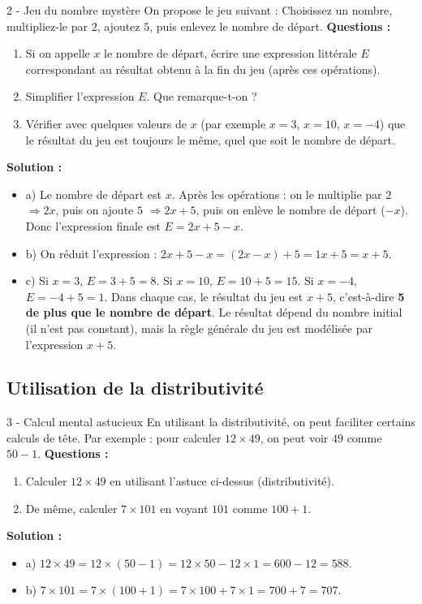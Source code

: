\begin{exercice}{2 - Jeu du nombre mystère} On propose le jeu suivant : \og Choisissez un nombre, multipliez-le par $2$, ajoutez $5$, puis enlevez le nombre de départ. \fg{}
\medskip
\textbf{Questions :} 
\begin{enumerate}[label=\alph*)] 
\item Si on appelle $x$ le nombre de départ, écrire une expression littérale $E$ correspondant au résultat obtenu à la fin du jeu (après ces opérations). 
\item Simplifier l'expression $E$. Que remarque-t-on ? 
\item Vérifier avec quelques valeurs de $x$ (par exemple $x=3$, $x=10$, $x=-4$) que le résultat du jeu est toujours le même, quel que soit le nombre de départ. 
\end{enumerate}

\textbf{Solution :} 
\begin{itemize} 
\item a) Le nombre de départ est $x$. Après les opérations : on le multiplie par $2$ $\Rightarrow 2x$, puis on ajoute $5$ $\Rightarrow 2x + 5$, puis on enlève le nombre de départ ($-x$). Donc l'expression finale est $E = 2x + 5 - x$. 
\item b) On réduit l'expression : $2x + 5 - x = (2x - x) + 5 = 1x + 5 = x + 5$. 
\item c) Si $x=3$, $E = 3 + 5 = 8$. Si $x=10$, $E = 10 + 5 = 15$. Si $x=-4$, $E = -4 + 5 = 1$. Dans chaque cas, le résultat du jeu est $x + 5$, c'est-à-dire \textbf{5 de plus que le nombre de départ}. Le résultat dépend du nombre initial (il n'est pas constant), mais la règle générale du jeu est modélisée par l'expression $x+5$. 
\end{itemize} 
\end{exercice}

\subsection{Utilisation de la distributivité}
\begin{exercice}{3 - Calcul mental astucieux} En utilisant la distributivité, on peut faciliter certains calculs de tête. Par exemple : pour calculer $12 \times 49$, on peut voir $49$ comme $50 - 1$.
\medskip
\textbf{Questions :} 
\begin{enumerate}[label=\alph*)] 
\item Calculer $12 \times 49$ en utilisant l'astuce ci-dessus (distributivité). 
\item De même, calculer $7 \times 101$ en voyant $101$ comme $100 + 1$. 
\end{enumerate}

\textbf{Solution :} 
\begin{itemize} 
\item a) $12 \times 49 = 12 \times (50 - 1) = 12 \times 50 - 12 \times 1 = 600 - 12 = 588$. \item b) $7 \times 101 = 7 \times (100 + 1) = 7 \times 100 + 7 \times 1 = 700 + 7 = 707$. \end{itemize} \end{exercice}

